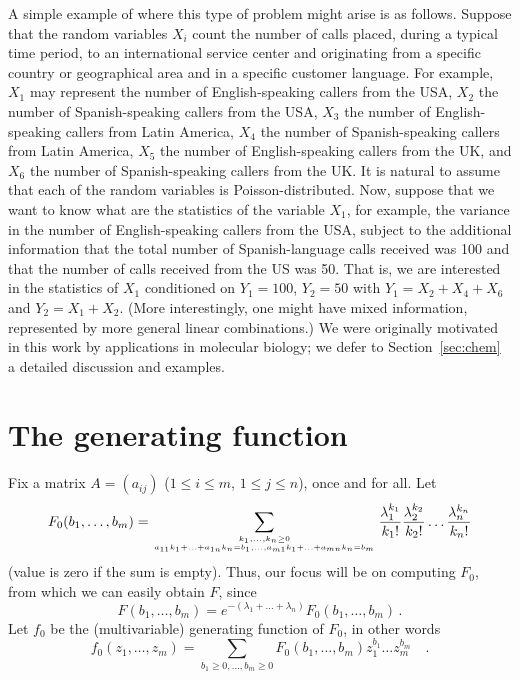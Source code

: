 \documentclass[11pt]{article}
\newcommand{\atopnew}[2]{\genfrac{}{}{0pt}{}{#1}{#2}}
\begin{document}
A simple example of where this type of problem might arise is as follows.
Suppose that the random variables $X_i$ count the number of calls placed,
during a typical 
time period, to an international service center and originating from a
specific country or geographical area and in a specific customer language.
For example, 
$X_1$ may represent the number of English-speaking callers from the USA, 
$X_2$ the number of Spanish-speaking callers from the USA, 
$X_3$ the number of English-speaking callers from Latin America, 
$X_4$ the number of Spanish-speaking callers from Latin America,
$X_5$ the number of English-speaking callers from the UK, 
and
$X_6$ the number of Spanish-speaking callers from the UK.
It is natural to assume that each of the random variables is
Poisson-distributed.
Now, suppose that we want to know what are the statistics of
the variable $X_1$, for example, the variance in the number of
English-speaking callers from the USA, subject to the additional information
that the total number of Spanish-language calls received was 100
and that the number of calls received from the US was 50.
That is, we are interested in the statistics of $X_1$ conditioned
on $Y_1=100$, $Y_2=50$ with $Y_1 = X_2+X_4+X_6$ and $Y_2=X_1+X_2$.
(More interestingly, one might have mixed information, represented by
more general linear combinations.)
We were originally motivated in this work by applications in molecular
biology; we defer to Section~\ref{sec:chem} a detailed discussion and
examples. 

\section{The generating function}
\label{sec:genfun}

Fix a matrix $A=(a_{ij})$ ($1 \leq i \leq m$,  $1 \leq j \leq n$),
once and for all. 
Let
\[
F_0(b_1, \ldots , b_m)=
\sum_{
\atopnew{k_1, \ldots , k_n \geq 0}%
{a_{11} k_1 + \ldots  + a_{1n} k_n=b_1 , \ldots  , 
a_{m1} k_1 + \ldots  + a_{mn} k_n=b_m}
}
\frac{\lambda _1^{k_1}}{k_1!}\frac{\lambda _2^{k_2}}{k_2!} \ldots   
\frac{\lambda _n^{k_n}}{k_n!}
\]
(value is zero if the sum is empty).
Thus, our focus will be on computing $F_0$, from which we can easily obtain
$F$, since
\[
F(b_1, \ldots , b_m)=
e^{-(\lambda _1 + \ldots  + \lambda _n)}F_0(b_1, \ldots , b_m) \,.
\]
Let 
$f_0$
be the (multivariable) generating function of 
$F_0$,
in other words
\[
f_0(z_1, \ldots , z_m)=\sum_{b_1 \geq 0, \ldots , b_m \geq 0} 
F_0(b_1, \ldots , b_m) z_1^{b_1} \ldots  z_m^{b_m} \quad.
\]
\end{document}
